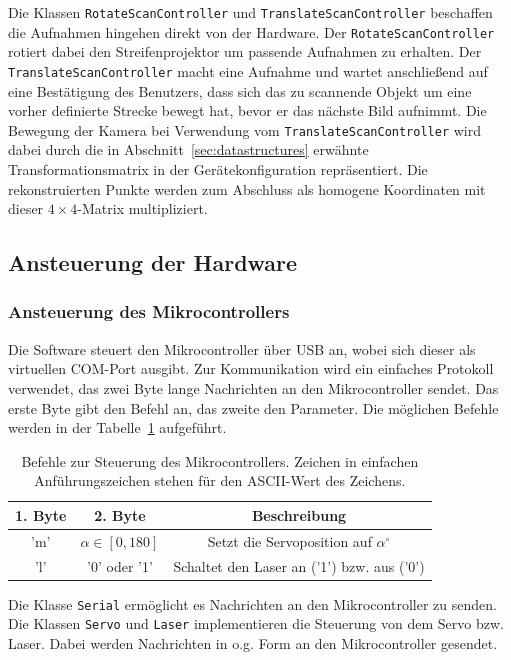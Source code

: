 \documentclass[ngerman,a4paper,parskip=half]{scrartcl}
\begin{document}
Die Klassen \texttt{RotateScanController} und \texttt{TranslateScanController} beschaffen die Aufnahmen hingehen direkt von der Hardware. Der \texttt{RotateScanController} rotiert dabei den Streifenprojektor um passende Aufnahmen zu erhalten. Der \texttt{TranslateScanController} macht eine Aufnahme und wartet anschließend auf eine Bestätigung des Benutzers, dass sich das zu scannende Objekt um eine vorher definierte Strecke bewegt hat, bevor er das nächste Bild aufnimmt.
Die Bewegung der Kamera bei Verwendung vom \texttt{TranslateScanController} wird dabei durch die in Abschnitt~\ref{sec:datastructures} erwähnte Transformationsmatrix in der Gerätekonfiguration repräsentiert. Die rekonstruierten Punkte werden zum Abschluss als homogene Koordinaten mit dieser $4 \times 4$-Matrix multipliziert.

\subsection{Ansteuerung der Hardware}

\subsubsection{Ansteuerung des Mikrocontrollers}

Die Software steuert den Mikrocontroller über USB an, wobei sich dieser als virtuellen COM-Port ausgibt. Zur Kommunikation wird ein einfaches Protokoll verwendet, das zwei Byte lange Nachrichten an den Mikrocontroller sendet. Das erste Byte gibt den Befehl an, das zweite den Parameter. Die möglichen Befehle werden in der Tabelle~\ref{tab:protocol} aufgeführt.

\begin{table}
	\centering
	\begin{tabular}{|c|c|c|}
		\hline
		\bfseries 1. Byte & \bfseries 2. Byte & \bfseries Beschreibung \\
		\hline
		'm' & $\alpha \in [0,180]$ & Setzt die Servoposition auf $\alpha^\circ$\\
		\hline
		'l' & '0' oder '1' & Schaltet den Laser an ('1') bzw. aus ('0')\\
		\hline
	\end{tabular}
	\caption{Befehle zur Steuerung des Mikrocontrollers. Zeichen in einfachen Anführungszeichen stehen für den ASCII-Wert des Zeichens.}
	\label{tab:protocol}
\end{table}

Die Klasse \texttt{Serial} ermöglicht es Nachrichten an den Mikrocontroller zu senden. Die Klassen \texttt{Servo} und \texttt{Laser} implementieren die Steuerung von dem Servo bzw. Laser. Dabei werden Nachrichten in o.g. Form an den Mikrocontroller gesendet.
\end{document}
